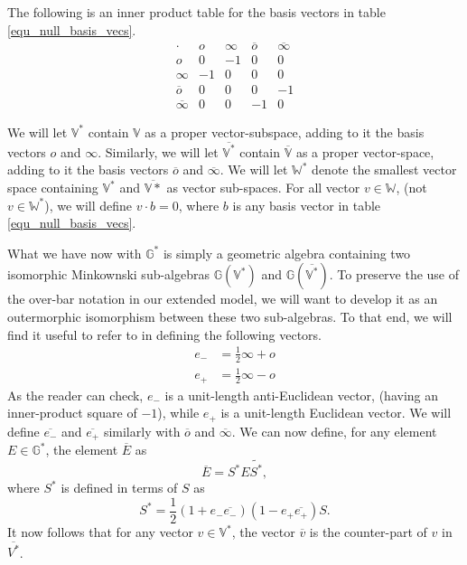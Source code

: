 \documentclass{birkjour}
\theoremstyle{definition}
\theoremstyle{remark}
\numberwithin{equation}{section}
\newcommand{\G}{\mathbb{G}}
\newcommand{\V}{\mathbb{V}}
\newcommand{\W}{\mathbb{W}}
\newcommand{\nvao}{o}
\newcommand{\nvai}{\infty}
\newcommand{\nvaob}{\overline{o}}
\newcommand{\nvaib}{\overline{\infty}}
\newcommand{\eminus}{e_{-}}
\newcommand{\eplus}{e_{+}}
\newcommand{\eminusb}{\overline{e_{-}}}
\newcommand{\eplusb}{\overline{e_{+}}}
\begin{document}
The following is an inner product table for the basis vectors in table \eqref{equ_null_basis_vecs}.
\begin{equation}
\begin{array}{c|cccc}
\cdot & \nvao & \nvai & \nvaob & \nvaib \\
\hline
\nvao & 0 & -1 & 0 & 0 \\
\nvai & -1 & 0 & 0 & 0 \\
\nvaob & 0 & 0 & 0 & -1 \\
\nvaib & 0 & 0 & -1 & 0
\end{array}
\end{equation}

We will let $\V^*$ contain $\V$ as a proper vector-subspace, adding to it the
basis vectors $\nvao$ and $\nvai$.  Similarly, we will let $\overline{\V^*}$ contain
$\overline{\V}$ as a proper vector-space, adding to it the basis vectors $\overline{\nvao}$
and $\overline{\nvai}$.  We will let $\W^*$ denote the smallest vector space containing
$\V^*$ and $\overline{\V*}$ as vector sub-spaces.
For all vector $v\in\W$, (not $v\in\W^*$), we will define $v\cdot b=0$, where
$b$ is any basis vector in table \eqref{equ_null_basis_vecs}.

What we have now with $\G^*$ is simply a geometric algebra containing
two isomorphic Minkownski sub-algebras $\G(\V^*)$ and $\G(\overline{\V^*})$.
To preserve the use of the over-bar notation in our extended model, we will want to develop it
as an outermorphic isomorphism between these two sub-algebras.  To that end, we will
find it useful to refer to \cite{LiRockwood} in defining the following vectors.
\begin{align}
\eminus &= \frac{1}{2}\nvai + \nvao \\
\eplus &= \frac{1}{2}\nvai - \nvao
\end{align}
As the reader can check, $\eminus$ is a unit-length anti-Euclidean vector, (having an inner-product
square of $-1$), while $\eplus$ is a unit-length Euclidean vector.  We will define
$\eminusb$ and $\eplusb$ similarly with $\nvaob$ and $\nvaib$.  We can now
define, for any element $E\in\G^*$, the element $\overline{E}$ as
\begin{equation}
\overline{E} = S^*E\tilde{S^*},
\end{equation}
where $S^*$ is defined in terms of $S$ as
\begin{equation}
S^* = \frac{1}{2}(1+\eminus\eminusb)(1-\eplus\eplusb)S.
\end{equation}
It now follows that for any vector $v\in\V^*$, the vector $\overline{v}$ is the
counter-part of $v$ in $\overline{V^*}$.
\end{document}

